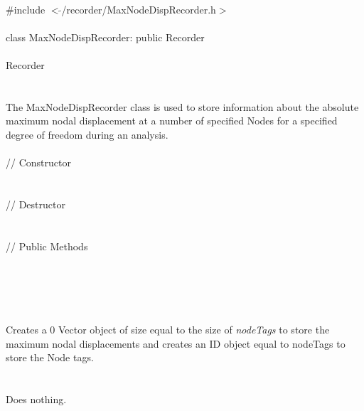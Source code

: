 
   \\
\indent \#include $<\tilde{ }$/recorder/MaxNodeDispRecorder.h$>$  \\

  \\
\indent class MaxNodeDispRecorder: public Recorder\\

 \\
\indent Recorder \\
\indent{} \\

  \\
\indent The MaxNodeDispRecorder class is used to store information
about the absolute maximum nodal displacement at a number of specified
Nodes for a specified degree of freedom during an analysis. \\

 \\
\indent // Constructor \\
\\ \\ 
\indent // Destructor \\
\\ \\
\indent // Public Methods  \\
\\
\\
\\ 

  \\
\\ 
Creates a $0$ Vector object of size equal to the size of {\em
nodeTags} to store the maximum nodal displacements
and creates an ID object equal to \p nodeTags to store the Node
tags. \\

 \\
\\ 
Does nothing. \\

